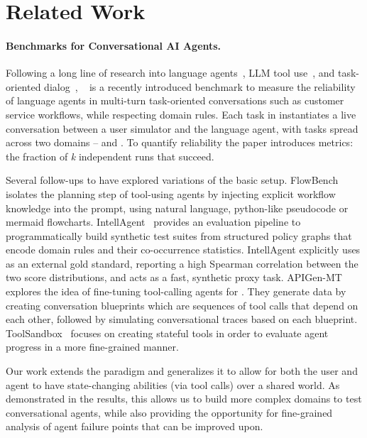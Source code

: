 \section{Related Work}

\paragraph{Benchmarks for Conversational AI Agents.}
Following a long line of research into language agents~\cite{yao2022webshop, zhou2023webarena, jimenez2023swe, liu2023agentbench, ruan2023identifying}, LLM tool use~\cite{berkeley-function-calling-leaderboard,qin2024toolllm,huang2023metatool}, and task-oriented dialog~\cite{chen2021action, budzianowski2018multiwoz, andreas2020task,schatzmann2007evaluating,gur2018hidden,he2018decoupling,Hu_2023}, \taubench~\cite{yao2024tau} is a recently introduced benchmark to measure the reliability of language agents in multi-turn task-oriented conversations such as customer service workflows, while respecting domain rules. Each task in \taubench instantiates a live conversation between a user simulator and the language agent, with tasks spread across two domains -- \retail and \airline. To quantify reliability the paper introduces \passk metrics: the fraction of \textit{k} independent runs that succeed.

Several follow-ups to \taubench have explored variations of the basic setup. FlowBench~\cite{xiao2024flowbench} isolates the planning step of tool-using agents by injecting explicit workflow knowledge into the prompt, using natural language, python-like pseudocode or mermaid flowcharts. IntellAgent~\cite{levi2025intellagent} provides an evaluation pipeline to programmatically build synthetic test suites from structured policy graphs that encode domain rules and their co-occurrence statistics. IntellAgent explicitly uses \taubench as an external gold standard, reporting a high Spearman correlation between the two score distributions, and acts as a fast, synthetic proxy task. APIGen-MT~\cite{prabhakar2025apigen} explores the idea of fine-tuning tool-calling agents for \taubench. They generate data by creating conversation blueprints which are sequences of tool calls that depend on each other, followed by simulating conversational traces based on each blueprint. ToolSandbox~\cite{lu2024toolsandbox} focuses on creating stateful tools in order to evaluate agent progress in a more fine-grained manner.

Our work extends the \taubench paradigm and generalizes it to allow for both the user and agent to have state-changing abilities (via tool calls) over a shared world. As demonstrated in the results, this allows us to build more complex domains to test conversational agents, while also providing the opportunity for fine-grained analysis of agent failure points that can be improved upon.

